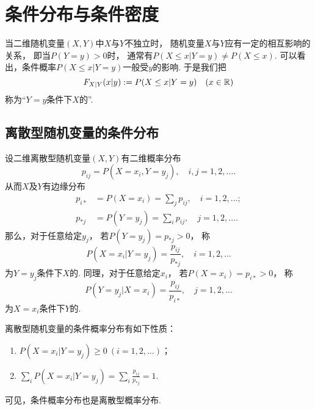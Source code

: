 \section{条件分布与条件密度}
当二维随机变量\((X,Y)\)中\(X\)与\(Y\)不独立时，
随机变量\(X\)与\(Y\)应有一定的相互影响的关系，
即当\(P(Y = y) > 0\)时，
通常有\(P(X \leq x \vert Y = y) \neq P(X \leq x)\).
可以看出，条件概率\(P(X \leq x \vert Y = y)\)一般受\(y\)的影响.
于是我们把\begin{equation*}
	F_{X \vert Y}(x \vert y)
	:=
	P(X \leq x \vert Y = y)
	\quad(x\in\mathbb{R})
\end{equation*}称为“\(Y=y\)条件下\(X\)的”.

\subsection{离散型随机变量的条件分布}
设二维离散型随机变量\((X,Y)\)有二维概率分布\begin{equation*}
	p_{ij} = P(X=x_i,Y=y_j),
	\quad i,j=1,2,\dotsc.
\end{equation*}
从而\(X\)及\(Y\)有边缘分布\begin{align*}
	p_{i*}
	&= P(X=x_i)
	= \sum_j p_{ij},
	\quad i=1,2,\dotsc; \\
	p_{*j}
	&= P(Y=y_j)
	= \sum_i p_{ij},
	\quad j=1,2,\dotsc.
\end{align*}
那么，对于任意给定\(y_j\)，
若\(P(Y=y_j) = p_{*j} > 0\)，
称\begin{equation*}
	P(X=x_i \vert Y=y_j) = \frac{p_{ij}}{p_{*j}},
	\quad i=1,2,\dotsc
\end{equation*}为\(Y=y_j\)条件下\(X\)的.
同理，对于任意给定\(x_i\)，
若\(P(X=x_i) = p_{i*} > 0\)，
称\begin{equation*}
	P(Y=y_j \vert X=x_i) = \frac{p_{ij}}{p_{i*}},
	\quad j=1,2,\dotsc
\end{equation*}为\(X=x_i\)条件下\(Y\)的.

\begin{property}
离散型随机变量的条件概率分布有如下性质：\begin{enumerate}
	\item \(P(X=x_i \vert Y=y_j) \geq 0\ (i=1,2,\dotsc)\)；
	\item \(\sum_i P(X=x_i \vert Y=y_j) = \sum_i \frac{p_{ij}}{p_{*j}} = 1\).
\end{enumerate}
可见，条件概率分布也是离散型概率分布.
\end{property}

